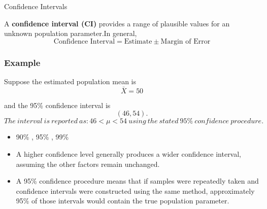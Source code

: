 \documentclass[aspectratio=169]{beamer}
\begin{document}
\begin{frame}{Confidence Intervals}


A \textbf{confidence interval (CI)} provides a range of plausible
values for an unknown population parameter.In general,
\vspace{0.0 cm}
\[
\boxed{
\text{Confidence Interval}
=
\text{Estimate}
\pm
\text{Margin of Error}
}
\]

\subsubsection*{Example}

Suppose the estimated population mean is
\vspace{0.0 cm}
\[
\bar{X}=50
\]

and the 95\% confidence interval is
\vspace{0.0 cm}
\[
(46,54).
\]
\[ The\ interval\ is\ reported\ as:
\boxed{46<\mu<54}
\ using\ the\ stated\ 95\%\ confidence\ procedure.\]

\begin{itemize}
    \item 90\% , 95\% , 99\%

\item A higher confidence level generally produces a wider confidence
interval, assuming the other factors remain unchanged.
\item A 95\% confidence procedure means that if samples were repeatedly
taken and confidence intervals were constructed using the same method,
approximately 95\% of those intervals would contain the true population
parameter.
\end{itemize}
\end{frame}
\end{document}
